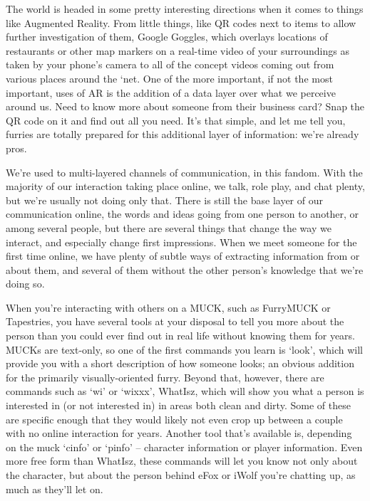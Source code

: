 
The world is headed in some pretty interesting directions when it comes to things like Augmented Reality.  From little things, like QR codes next to items to allow further investigation of them, Google Goggles, which overlays locations of restaurants or other map markers on a real-time video of your surroundings as taken by your phone’s camera to all of the concept videos coming out from various places around the `net.  One of the more important, if not the most important, uses of AR is the addition of a data layer over what we perceive around us.  Need to know more about someone from their business card?  Snap the QR code on it and find out all you need.  It’s that simple, and let me tell you, furries are totally prepared for this additional layer of information: we’re already pros.

We’re used to multi-layered channels of communication, in this fandom.  With the majority of our interaction taking place online, we talk, role play, and chat plenty, but we’re usually not doing only that.  There is still the base layer of our communication online, the words and ideas going from one person to another, or among several people, but there are several things that change the way we interact, and especially change first impressions.  When we meet someone for the first time online, we have plenty of subtle ways of extracting information from or about them, and several of them without the other person’s knowledge that we’re doing so.

When you’re interacting with others on a MUCK, such as FurryMUCK or Tapestries, you have several tools at your disposal to tell you more about the person than you could ever find out in real life without knowing them for years.  MUCKs are text-only, so one of the first commands you learn is `look’, which will provide you with a short description of how someone looks; an obvious addition for the primarily visually-oriented furry.  Beyond that, however, there are commands such as `wi’ or `wixxx’, WhatIsz, which will show you what a person is interested in (or not interested in) in areas both clean and dirty.  Some of these are specific enough that they would likely not even crop up between a couple with no online interaction for years.  Another tool that’s available is, depending on the muck `cinfo’ or `pinfo’ -- character information or player information.  Even more free form than WhatIsz, these commands will let you know not only about the character, but about the person behind eFox or iWolf you’re chatting up, as much as they’ll let on.

